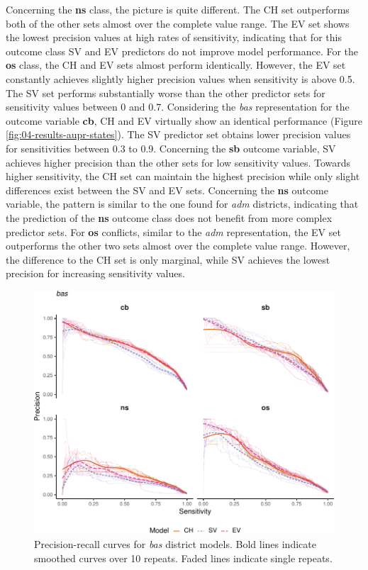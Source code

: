 \documentclass[a4paper,11pt]{article}
\begin{document}
Concerning the \textbf{ns} class, the picture is quite different. The CH set outperforms
both of the other sets almost over the complete value range. The EV set shows the
lowest precision values at high rates of sensitivity, indicating that for this
outcome class SV and EV predictors do not improve model performance. For the \textbf{os}
class, the CH and EV sets almost perform identically. However, the EV set
constantly achieves slightly higher precision values when sensitivity is above 0.5.
The SV set performs substantially worse than the other predictor sets for sensitivity
values between 0 and 0.7. Considering the \emph{bas} representation for the outcome
variable \textbf{cb}, CH and EV virtually show an identical performance (Figure \ref{fig:04-results-aupr-states}).
The SV predictor set obtains lower precision values for sensitivities between
0.3 to 0.9. Concerning the \textbf{sb} outcome variable, SV achieves higher precision
than the other sets for low sensitivity values. Towards higher sensitivity,
the CH set can maintain the highest precision while only slight differences
exist between the SV and EV sets. Concerning the \textbf{ns} outcome variable,
the pattern is similar to the one found for \emph{adm} districts, indicating that
the prediction of the \textbf{ns} outcome class does not benefit from more complex
predictor sets. For \textbf{os} conflicts, similar to the \emph{adm} representation, the EV
set outperforms the other two sets almost over the complete value range. However,
the difference to the CH set is only marginal, while SV achieves the lowest
precision for increasing sensitivity values.
\begin{figure}[H]

{\centering \includegraphics{thesis_files/figure-latex/04-results-aupr-basins-1} 

}

\caption[Precision-recall curves for \textit{bas} district models.]{Precision-recall curves for \textit{bas} district models. Bold lines indicate smoothed curves over 10 repeats. Faded lines indicate single repeats.}\label{fig:04-results-aupr-basins}
\end{figure}
\end{document}
